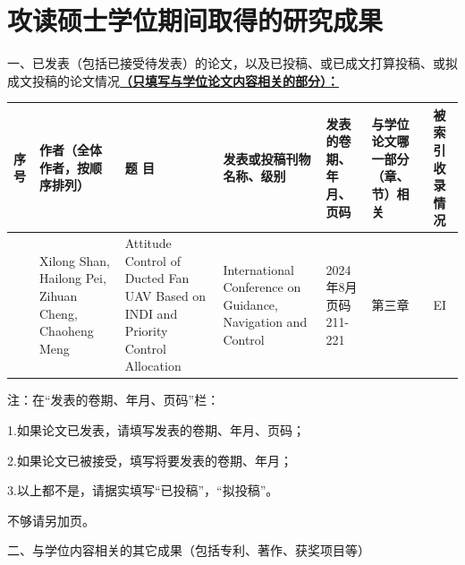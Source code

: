 \chapter{攻读硕士学位期间取得的研究成果} %
\pubfont %
一、已发表（包括已接受待发表）的论文，以及已投稿、或已成文打算投稿、或拟成文投稿的论文情况\underline{\textbf{（只填写与学位论文内容相关的部分）：}}
\begin{table}
	\centering{}%
	\pubfont 
	\begin{longtable}{|>{\centering}m{0.5cm}|m{2.2cm}|>{\centering}m{2.8cm}|>{\centering}m{2.9cm}|>{\centering}m{2.2cm}|>{\centering}m{1.4cm}|>{\centering}m{0.8cm}|}
		\hline 
		\textbf{序号} & \textbf{作者（全体作者，按顺序排列）} & \textbf{题 目}   & \textbf{发表或投稿刊物名称、级别} & \textbf{发表的卷期、年月、页码} & \textbf{与学位论文哪一部分（章、节）相关} &\textbf{被索引收录情况}\tabularnewline
		\hline
		1    &	Xilong Shan, Hailong Pei, Zihuan Cheng, Chaoheng Meng		  & Attitude Control of Ducted Fan UAV Based on INDI and Priority Control Allocation & 2024 International Conference on Guidance, Navigation and Control & 2024年8月 页码211-221 & 第三章 & EI \tabularnewline
		\hline 
	\end{longtable}
\end{table}


注：在“发表的卷期、年月、页码”栏：

1.如果论文已发表，请填写发表的卷期、年月、页码；

2.如果论文已被接受，填写将要发表的卷期、年月；

3.以上都不是，请据实填写“已投稿”，“拟投稿”。

不够请另加页。



二、与学位内容相关的其它成果（包括专利、著作、获奖项目等）





\normalsize %